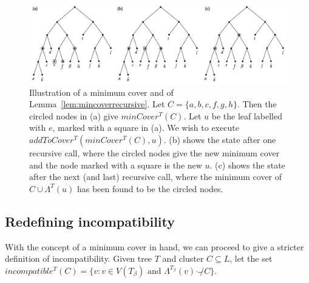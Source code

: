 \documentclass{article}
\newcommand{\compatible}{\smile}
\newcommand{\leafset}{\Lambda}
\newcommand{\TB}{T_\beta}
\begin{document}
    \begin{figure}[h]
        \includegraphics[scale=0.48]{mincover}
        \centering
        \caption{Illustration of a minimum cover and of Lemma~\ref{lem:mincoverrecursive}. Let $C = \{a, b, c, f, g, h\}$. Then the circled nodes in (a) give $minCover^{T}(C)$. Let $u$ be the leaf labelled with $e$, marked with a square in (a). We wish to execute $addToCover^{T}(minCover^{T}(C), u)$. (b) shows the state after one recursive call, where the circled nodes give the new minimum cover and the node marked with a square is the new $u$. (c) shows the state after the next (and last) recursive call, where the minimum cover of $C \cup \leafset^{T}(u)$ has been found to be the circled nodes.}
        \label{fig:mincover}
    \end{figure}

    \subsection{Redefining incompatibility}
    \label{subsec:redefiningincompatibility}

    With the concept of a minimum cover in hand, we can proceed to give a stricter definition of incompatibility. Given tree $T$ and cluster $C \subseteq L$, let the set $incompatible^{T}(C) = \{v : v \in V(\TB) \text{ and } \leafset^{\TB}(v) \not\compatible C\}$.
    \newline
\end{document}
